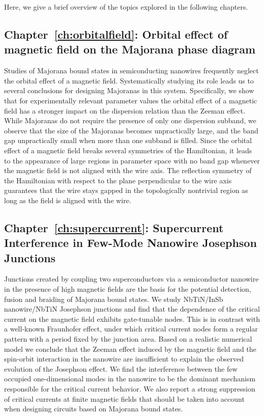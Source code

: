 Here, we give a brief overview of the topics explored in the following chapters.
\vspace{1mm}

\subsection{Chapter~\ref{ch:orbitalfield}: Orbital effect of magnetic field on the Majorana phase diagram}
Studies of Majorana bound states in semiconducting nanowires frequently neglect the orbital effect of a magnetic field.
Systematically studying its role leads us to several conclusions for designing Majoranas in this system.
Specifically, we show that for experimentally relevant parameter values the orbital effect of a magnetic field has a stronger impact on the dispersion relation than the Zeeman effect.
While Majoranas do not require the presence of only one dispersion subband, we observe that the size of the Majoranas becomes unpractically large, and the band gap unpractically small when more than one subband is filled.
Since the orbital effect of a magnetic field breaks several symmetries of the Hamiltonian, it leads to the appearance of large regions in parameter space with no band gap whenever the magnetic field is not aligned with the wire axis.
The reflection symmetry of the Hamiltonian with respect to the plane perpendicular to the wire axis guarantees that the wire stays gapped in the topologically nontrivial region as long as the field is aligned with the wire.
\vspace{1mm}

\subsection{Chapter~\ref{ch:supercurrent}: Supercurrent Interference in Few-Mode Nanowire Josephson Junctions}
Junctions created by coupling two superconductors via a semiconductor nanowire in the presence of high magnetic fields are the basis for the potential detection, fusion and braiding of Majorana bound states.
We study NbTiN/InSb nanowire/NbTiN Josephson junctions and find that the dependence of the critical current on the magnetic field exhibits gate-tunable nodes.
This is in contrast with a well-known Fraunhofer effect, under which critical current nodes form a regular pattern with a period fixed by the junction area.
Based on a realistic numerical model we conclude that the Zeeman effect induced by the magnetic field and the spin-orbit interaction in the nanowire are insufficient to explain the observed evolution of the Josephson effect.
We find the interference between the few occupied one-dimensional modes in the nanowire to be the dominant mechanism responsible for the critical current behavior.
We also report a strong suppression of critical currents at finite magnetic fields that should be taken into account when designing circuits based on Majorana bound states.
\vspace{1mm}


